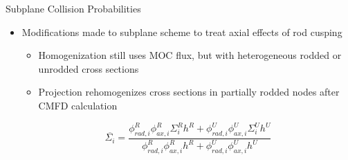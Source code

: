 
\begin{frame}[t]{Subplane Collision Probabilities}
    
    \begin{itemize}
        \item Modifications made to subplane scheme \cite{Graham2017Improvementofthe2D/1DMethodUsingtheSub-PlaneScheme,Graham2017RodDecuspingTechniquesforthe2D/1DMethod} to treat axial effects of rod cusping
        \begin{itemize}
            \item Homogenization still uses MOC flux, but 
            with heterogeneous rodded or unrodded cross sections
            \item Projection rehomogenizes cross sections in partially rodded nodes 
            after CMFD calculation
        \end{itemize}
        \begin{equation}\label{e:nTRACERdecusping}
        \overline{\Sigma_i} = \frac{\phi_{rad,i}^R \phi_{ax,i}^R \Sigma_i^R h^R + \phi_{rad,i}^U \phi_{ax,i}^U \Sigma_i^U h^U}{\phi_{rad,i}^R \phi_{ax,i}^R h^R + \phi_{rad,i}^U \phi_{ax,i}^U h^U} \nonumber
        \end{equation}
    \end{itemize}
    
\end{frame}


